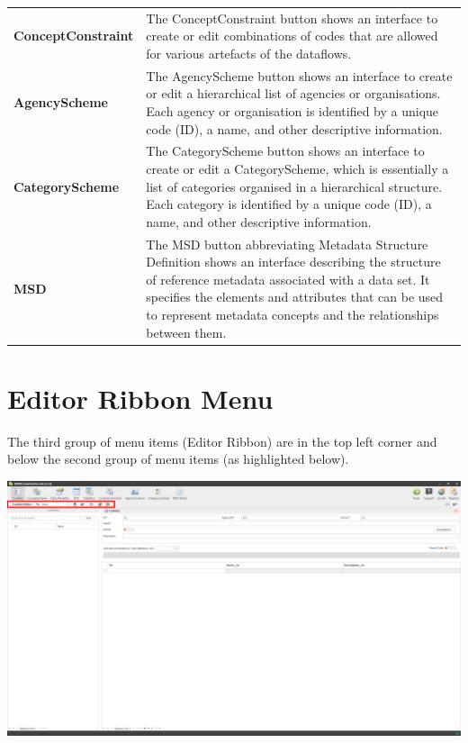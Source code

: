 \documentclass[
]{book}
\begin{document}
\begin{longtable}[]{@{}
  >{\raggedright\arraybackslash}p{}
  >{\raggedright\arraybackslash}p{}@{}}
\textbf{ConceptConstraint} & The ConceptConstraint button shows an interface to create or edit combinations of codes that are allowed for various artefacts of the dataflows. \\
\textbf{AgencyScheme} & The AgencyScheme button shows an interface to create or edit a hierarchical list of agencies or organisations. Each agency or organisation is identified by a unique code (ID), a name, and other descriptive information. \\
\textbf{CategoryScheme} & The CategoryScheme button shows an interface to create or edit a CategoryScheme, which is essentially a list of categories organised in a hierarchical structure. Each category is identified by a unique code (ID), a name, and other descriptive information. \\
\textbf{MSD} & The MSD button abbreviating Metadata Structure Definition shows an interface describing the structure of reference metadata associated with a data set. It specifies the elements and attributes that can be used to represent metadata concepts and the relationships between them. \\
\bottomrule()
\end{longtable}

\hypertarget{editor-ribbon-menu}{%
\section{Editor Ribbon Menu}\label{editor-ribbon-menu}}

The third group of menu items (Editor Ribbon) are in the top left corner and below the second group of menu items (as highlighted below).

\begin{center}\includegraphics[width=1\linewidth]{./images/image015} \end{center}
\end{document}

